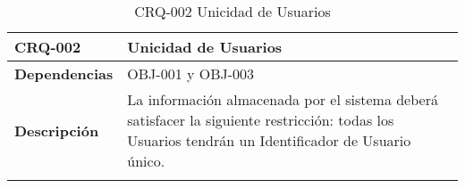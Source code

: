 \begin{center}
\begin{longtable}{|p{80pt}|p{9cm}|}
\hline
\textbf{CRQ-002} & Unicidad de Usuarios \\ \hline
\textbf{Dependencias} & OBJ-001 y OBJ-003 \\ \hline
\textbf{Descripción} & La información almacenada por el sistema deberá satisfacer la siguiente restricción: todas los Usuarios tendrán un Identificador de Usuario único. \\ \hline
\caption{CRQ-002 Unicidad de Usuarios}
\end{longtable}
\end{center}
